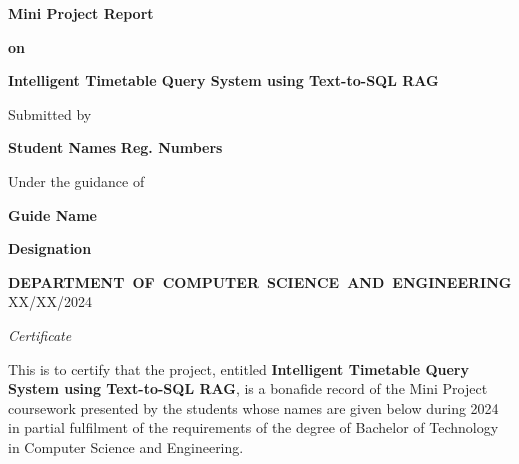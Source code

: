\documentclass[12pt]{article}
\begin{document}
\begin{titlepage}
\doublespacing

\begin{center}
\par {\large \textbf{Mini Project Report}}\\
\end{center}

\begin{center}
	\par {\large \textbf{on}}
\end{center}

\begin{center}
{\Large \textbf{Intelligent Timetable Query System using Text-to-SQL RAG}}
\end{center}

{\small
\begin{center}
\par \small {Submitted by}
\par \Large \textbf{Student Names} \textbf{Reg. Numbers}
\par Under the guidance of
\par \large \textbf{Guide Name}
\par \textbf{Designation}
\end{center}
}

\begin{figure}[h]
\begin{center}
\end{center}
\end{figure}

\begin{center}
\par{\mbox {\small\textbf{DEPARTMENT OF COMPUTER SCIENCE AND ENGINEERING}}}
\\
XX/XX/2024

\end{center}
\end{titlepage}

\newpage
\thispagestyle{empty}
\clearpage             
\thispagestyle{empty}  
\phantom{a}            
\newpage
\thispagestyle{empty}

\begin{center}	
	\emph{\huge{Certificate}}\\[2.5cm]
\end{center}
\normalsize This is to certify that the project, entitled \textbf{Intelligent Timetable Query System using Text-to-SQL RAG}, is a bonafide record of the Mini Project coursework presented by the students whose names are given below during 2024 in partial fulfilment of the requirements of the degree of Bachelor of Technology in Computer Science and Engineering.\\[1.0cm]
\end{document}
